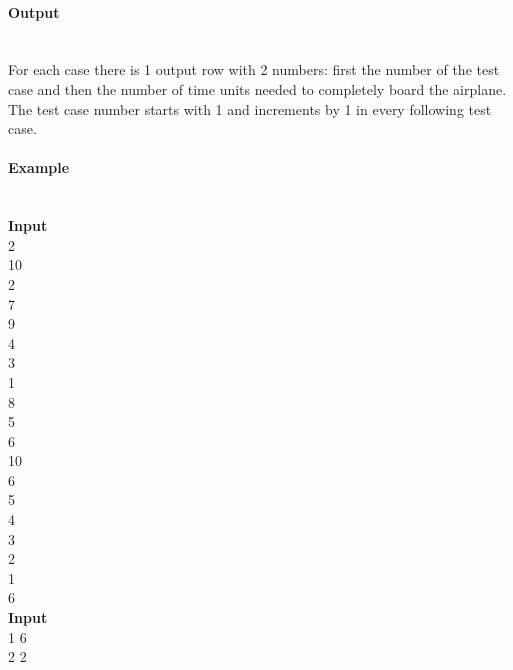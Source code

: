 \documentclass[10pt,a4paper]{article}
\begin{document}
\paragraph{Output\\ \\}

For each case there is 1 output row with 2 numbers: first the number of the test case and then the number of time units needed to completely board the airplane. The test case number starts with 1 and increments by 1 in every following test case.


\paragraph{Example\\ \\}

\textbf{Input} \\
2 \\10 \\2 \\7 \\9 \\4\\ 3\\1 \\8 \\5 \\6 \\10 \\6 \\ 5\\ 4\\ 3\\ 2\\ 1\\ 6\\

\textbf{Input} \\
1 6 \\
2 2
\end{document}
